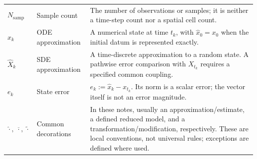\begin{longtable}{@{}>{\raggedright\arraybackslash}p{32mm}>{\raggedright\arraybackslash}p{26mm}>{\raggedright\arraybackslash}p{90mm}@{}}
$N_{\mathrm{samp}}$ & Sample count & The number of observations or samples; it is neither a time-step count nor a spatial cell count.\\[3pt]
$\widehat x_k$ & ODE approximation & A numerical state at time $t_k$, with $\widehat x_0=x_0$ when the initial datum is represented exactly.\\[3pt]
$\widehat X_k$ & SDE approximation & A time-discrete approximation to a random state. A pathwise error comparison with $X_{t_k}$ requires a specified common coupling.\\[3pt]
$e_k$ & State error & $e_k:=\widehat x_k-x_{t_k}$. Its norm is a scalar error; the vector itself is not an error magnitude.\\[3pt]
$\widehat{\cdot},\ \overline{\cdot},\ \widetilde{\cdot}$ & Common decorations & In these notes, usually an approximation/estimate, a defined reduced model, and a transformation/modification, respectively. These are local conventions, not universal rules; exceptions are defined where used.\\[3pt]
\end{longtable}
\addtocounter{table}{-1}
\endgroup

